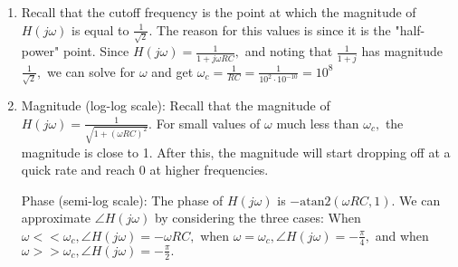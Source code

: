 \begin{enumerate}
{\begin{enumerate}[label=(\roman*)]
    \vspace{0.1 cm} 

    Since this filter allows low frequencies to go through and blocks high frequencies, it is called a \emph{low-pass filter}.

  \item Recall that the cutoff frequency is the point at which the magnitude of $H(j \omega)$ is equal to $\frac{1}{\sqrt{2}}.$ 
  The reason for this values is since it is the "half-power" point. Since $H(j \omega) = \frac{1}{1 + j \omega RC},$ and noting that $\frac{1}{1 + j}$ has magnitude $\frac{1}{\sqrt{2}},$ we can solve for $\omega$ and get $\omega_{c} = \frac{1}{RC} = \frac{1}{10^{2} \cdot 10^{-10}} = 10^{8}$

  \item {
  Magnitude (log-log scale): 
  Recall that the magnitude of $H(j \omega) = \frac{1}{\sqrt{1 + (\omega RC)^2}}.$ For small values of $\omega$ much less than $\omega_{c},$ the magnitude is close to 1. After this, the magnitude will start dropping off at a quick rate and reach $0$ at higher frequencies.

  
  Phase (semi-log scale): The phase of $H(j \omega)$ is $-\text{atan2}(\omega RC, 1).$ We can approximate $\angle{H (j \omega)}$ by considering the three cases: When $\omega << \omega_{c}, \angle H(j \omega) = -\omega RC,$ when $\omega = \omega_{c}, \angle H(j \omega) = -\frac{\pi}{4},$ and when $\omega >> \omega_{c}, \angle H(j \omega) = -\frac{\pi}{2}.$

}
\end{enumerate}}
\end{enumerate}
